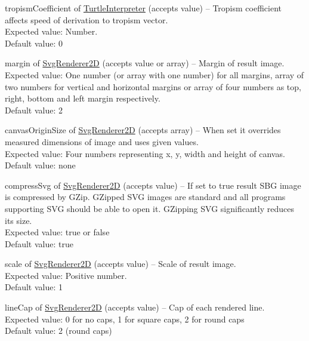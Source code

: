 \begin{description*}
		\item[tropismCoefficient] of \hyperref[Malsys.Processing.Components.Interpreters.TurtleInterpreter]{TurtleInterpreter}
		(accepts value)
			-- Tropism coefficient affects speed of derivation to tropism vector.
			\\ Expected value: Number.
			\\ Default value: 0
		\item[margin] of \hyperref[Malsys.Processing.Components.Renderers.SvgRenderer2D]{SvgRenderer2D}
		(accepts value or array)
			-- Margin of result image.
			\\ Expected value: One number (or array with one number) for all margins, array of two numbers for vertical and horizontal margins
            or array of four numbers as top, right, bottom and left margin respectively.
			\\ Default value: 2
		\item[canvasOriginSize] of \hyperref[Malsys.Processing.Components.Renderers.SvgRenderer2D]{SvgRenderer2D}
		(accepts array)
			-- When set it overrides measured dimensions of image and uses given values.
			\\ Expected value: Four numbers representing x, y, width and height of canvas.
			\\ Default value: none
		\item[compressSvg] of \hyperref[Malsys.Processing.Components.Renderers.SvgRenderer2D]{SvgRenderer2D}
		(accepts value)
			-- If set to true result SBG image is compressed by GZip.
            GZipped SVG images are standard and all programs supporting SVG should be able to open it.
            GZipping SVG significantly reduces its size.
			\\ Expected value: true or false
			\\ Default value: true
		\item[scale] of \hyperref[Malsys.Processing.Components.Renderers.SvgRenderer2D]{SvgRenderer2D}
		(accepts value)
			-- Scale of result image.
			\\ Expected value: Positive number.
			\\ Default value: 1
		\item[lineCap] of \hyperref[Malsys.Processing.Components.Renderers.SvgRenderer2D]{SvgRenderer2D}
		(accepts value)
			-- Cap of each rendered line.
			\\ Expected value: 0 for no caps, 1 for square caps, 2 for round caps
			\\ Default value: 2 (round caps)
	\end{description*}
